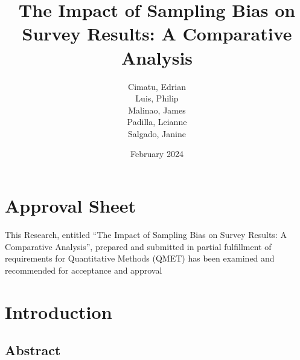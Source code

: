 \documentclass[12pt, a4paper]{report}
\title{The Impact of Sampling Bias on Survey Results: A Comparative Analysis}
\author{
  Cimatu, Edrian\\
  Luis, Philip\\
  Malinao, James\\
  Padilla, Leianne\\
  Salgado, Janine\\
}
\date{February 2024}
\begin{document}
\maketitle

\section*{Approval Sheet}
This Research, entitled “The Impact of Sampling Bias on Survey Results: A Comparative Analysis”, prepared and submitted in partial fulfillment of requirements for Quantitative Methods (QMET) has been examined and recommended for acceptance and approval

\section{Introduction}
\subsection*{Abstract}
\end{document}
